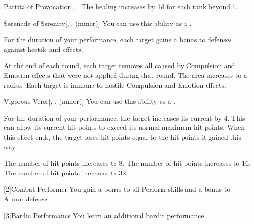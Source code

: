 {\begin{freeability}{Partita of Provocation}[, ]
                \rankline
                The healing increases by \plus1d for each rank beyond 1.
            \end{freeability}

            \begin{freeability}{Serenade of Serenity}[, ,  (minor)]
                You can use this ability as a .

                For the duration of your performance, each target gains a  bonus to defenses against hostile  and  effects.

                \rankline
                 At the end of each round, each target removes all  caused by Compulsion and Emotion effects that were not applied during that round.
                 The area increases to a \areahuge radius.
                 Each target is immune to hostile Compulsion and Emotion effects.
            \end{freeability}

            \begin{freeability}{Vigorous Verse}[, ,  (minor)]
                You can use this ability as a .

                For the duration of your performance, the target increases its current  by 4.
                This can allow its current hit points to exceed its normal maximum hit points.
                When this effect ends, the target loses hit points equal to the hit points it gained this way.

                \rankline
                 The number of hit points increases to 8.
                 The number of hit points increases to 16.
                 The number of hit points increases to 32.
            \end{freeability}
        }

        [2]{Combat Performer} You gain a  bonus to all Perform skills and a  bonus to Armor defense.

        [3]{Bardic Performance} You learn an additional bardic performance.

